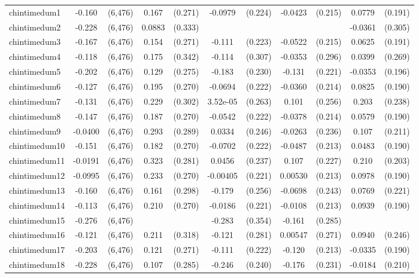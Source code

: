 \documentclass[]{article}
\begin{document}
\begin{tabular}{lcccccccccc}
chintimedum1 & -0.160 & (6,476) & 0.167 & (0.271) & -0.0979 & (0.224) & -0.0423 & (0.215) & 0.0779 & (0.191) \\
chintimedum2 & -0.228 & (6,476) & 0.0883 & (0.333) &  &  &  &  & -0.0361 & (0.305) \\
chintimedum3 & -0.167 & (6,476) & 0.154 & (0.271) & -0.111 & (0.223) & -0.0522 & (0.215) & 0.0625 & (0.191) \\
chintimedum4 & -0.118 & (6,476) & 0.175 & (0.342) & -0.114 & (0.307) & -0.0353 & (0.296) & 0.0399 & (0.269) \\
chintimedum5 & -0.202 & (6,476) & 0.129 & (0.275) & -0.183 & (0.230) & -0.131 & (0.221) & -0.0353 & (0.196) \\
chintimedum6 & -0.127 & (6,476) & 0.195 & (0.270) & -0.0694 & (0.222) & -0.0360 & (0.214) & 0.0825 & (0.190) \\
chintimedum7 & -0.131 & (6,476) & 0.229 & (0.302) & 3.52e-05 & (0.263) & 0.101 & (0.256) & 0.203 & (0.238) \\
chintimedum8 & -0.147 & (6,476) & 0.187 & (0.270) & -0.0542 & (0.222) & -0.0378 & (0.214) & 0.0579 & (0.190) \\
chintimedum9 & -0.0400 & (6,476) & 0.293 & (0.289) & 0.0334 & (0.246) & -0.0263 & (0.236) & 0.107 & (0.211) \\
chintimedum10 & -0.151 & (6,476) & 0.182 & (0.270) & -0.0702 & (0.222) & -0.0487 & (0.213) & 0.0483 & (0.190) \\
chintimedum11 & -0.0191 & (6,476) & 0.323 & (0.281) & 0.0456 & (0.237) & 0.107 & (0.227) & 0.210 & (0.203) \\
chintimedum12 & -0.0995 & (6,476) & 0.233 & (0.270) & -0.00405 & (0.221) & 0.00530 & (0.213) & 0.0978 & (0.190) \\
chintimedum13 & -0.160 & (6,476) & 0.161 & (0.298) & -0.179 & (0.256) & -0.0698 & (0.243) & 0.0769 & (0.221) \\
chintimedum14 & -0.113 & (6,476) & 0.210 & (0.270) & -0.0186 & (0.221) & -0.0108 & (0.213) & 0.0939 & (0.190) \\
chintimedum15 & -0.276 & (6,476) &  &  & -0.283 & (0.354) & -0.161 & (0.285) &  &  \\
chintimedum16 & -0.121 & (6,476) & 0.211 & (0.318) & -0.121 & (0.281) & 0.00547 & (0.271) & 0.0940 & (0.246) \\
chintimedum17 & -0.203 & (6,476) & 0.121 & (0.271) & -0.111 & (0.222) & -0.120 & (0.213) & -0.0335 & (0.190) \\
chintimedum18 & -0.228 & (6,476) & 0.107 & (0.285) & -0.246 & (0.240) & -0.176 & (0.231) & -0.0184 & (0.210) \\

\end{tabular}
\end{document}
